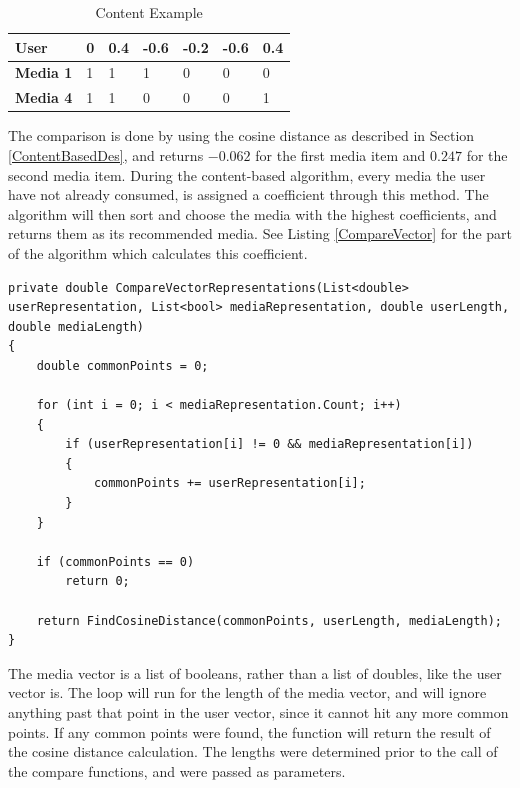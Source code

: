 \begin{table}[htb]
\centering
\begin{tabular}{|l|l|l|l|l|l|l|} \hline
	\textbf{User} & 0 & 0.4 & -0.6 & -0.2 & -0.6 & 0.4 \\ \hline
	\textbf{Media 1} & 1 & 1 & 1 & 0 & 0 & 0 \\ \hline
	\textbf{Media 4} & 1 & 1 & 0 & 0 & 0 & 1 \\ \hline
\end{tabular}
\caption{Content Example}
\label{ContentEx}
\end{table}

The comparison is done by using the cosine distance as described in Section \ref{ContentBasedDes}, and returns $-0.062$ for the first media item and $0.247$ for the second media item. During the content-based algorithm, every media the user have not already consumed, is assigned a coefficient through this method. The algorithm will then sort and choose the media with the highest coefficients, and returns them as its recommended media. See Listing \ref{CompareVector} for the part of the algorithm which calculates this coefficient.
\newpage
\begin{lstlisting}[caption={The CompareVectorRepresentations method},label={CompareVector}]
private double CompareVectorRepresentations(List<double> userRepresentation, List<bool> mediaRepresentation, double userLength, double mediaLength)
{
	double commonPoints = 0;

	for (int i = 0; i < mediaRepresentation.Count; i++)
	{
		if (userRepresentation[i] != 0 && mediaRepresentation[i])
		{
			commonPoints += userRepresentation[i];
		}
	}

	if (commonPoints == 0)
		return 0;

	return FindCosineDistance(commonPoints, userLength, mediaLength);
}
\end{lstlisting}

The media vector is a list of booleans, rather than a list of doubles, like the user vector is. The loop will run for the length of the media vector, and will ignore anything past that point in the user vector, since it cannot hit any more common points. If any common points were found, the function will return the result of the cosine distance calculation. The lengths were determined prior to the call of the compare functions, and were passed as parameters.